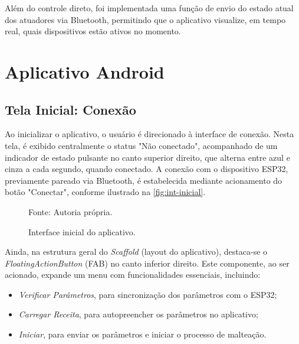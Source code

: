 Além do controle direto, foi implementada uma função de envio do estado atual dos atuadores via Bluetooth, permitindo que o aplicativo visualize, em tempo real, quais dispositivos estão ativos no momento.

\section{Aplicativo Android}\label{sec:aplicativo-android}

\subsection{Tela Inicial: Conexão}\label{subsec:conexao}
Ao inicializar o aplicativo, o usuário é direcionado à interface de conexão. Nesta tela, é exibido centralmente o status "Não conectado", acompanhado de um indicador de estado pulsante no canto superior direito, que alterna entre azul e cinza a cada segundo, quando conectado. A conexão com o dispositivo ESP32, previamente pareado via Bluetooth, é estabelecida mediante acionamento do botão "Conectar", conforme ilustrado na \autoref{fig:int-inicial}.

\begin{figure}[H]
    \caption{Interface inicial do aplicativo.}
    \label{fig:int-inicial}
    \centering
    \hfill
    \hfill

    {\centering\footnotesize Fonte: Autoria própria.\par}

  \end{figure}


Ainda, na estrutura geral do \textit{Scaffold} (layout do aplicativo), destaca-se o \textit{FloatingActionButton} (FAB) no canto inferior direito. Este componente, ao ser acionado, expande um menu com funcionalidades essenciais, incluindo:

\begin{itemize}
    \item \textit{Verificar Parâmetros}, para sincronização dos parâmetros com o ESP32;
    \item \textit{Carregar Receita}, para autopreencher os parâmetros no aplicativo;
    \item \textit{Iniciar}, para enviar os parâmetros e iniciar o processo de malteação.
\end{itemize}


